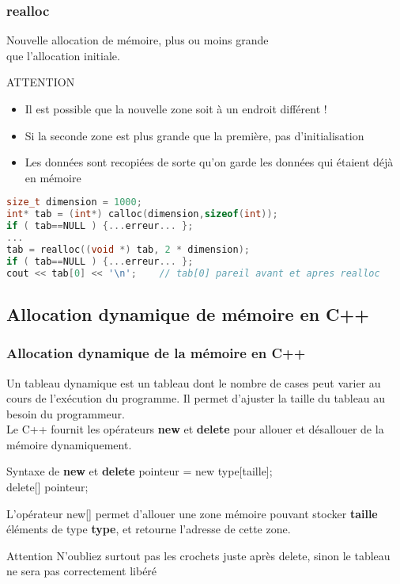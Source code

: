 \documentclass{beamer}
\begin{document}
\begin{frame}[fragile=singleslide,shrink=20]
\frametitle{realloc}
Nouvelle allocation de mémoire, plus ou moins grande \\
que l'allocation initiale.

\begin{block}{ATTENTION}
\begin{itemize}
\item{Il est possible que la nouvelle zone soit à un endroit différent !}
\item{Si la seconde zone est plus grande que la première, pas d'initialisation}
\item{Les données sont recopiées de sorte qu'on garde les données qui étaient déjà en mémoire}
\end{itemize}
\begin{lstlisting}[language=c++]
size_t dimension = 1000;
int* tab = (int*) calloc(dimension,sizeof(int));
if ( tab==NULL ) {...erreur... };
...
tab = realloc((void *) tab, 2 * dimension);
if ( tab==NULL ) {...erreur... };
cout << tab[0] << '\n';    // tab[0] pareil avant et apres realloc
\end{lstlisting}
\end{block}
\end{frame}

\subsection{Allocation dynamique de mémoire en C++}

\begin{frame}[fragile=singleslide,shrink=20]
\frametitle{Allocation dynamique de la mémoire en C++}
Un tableau dynamique est un tableau dont le nombre de cases peut varier au cours de l'exécution du programme. Il permet d'ajuster la taille du tableau au besoin du programmeur.\\
Le C++ fournit les opérateurs \textbf{new} et \textbf{delete} pour allouer et désallouer de la mémoire dynamiquement.

\begin{block}{Syntaxe de \textbf{new} et \textbf{delete}}
pointeur = new type[taille];\\
delete[] pointeur;
\end{block}

L'opérateur new[] permet d'allouer une zone mémoire pouvant stocker \textbf{taille} éléments de type \textbf{type}, et retourne l'adresse de cette zone. 

\begin{block}{Attention}
N'oubliez surtout pas les crochets juste après delete, sinon le tableau ne sera pas correctement libéré
\end{block}

\end{frame}
\end{document}

